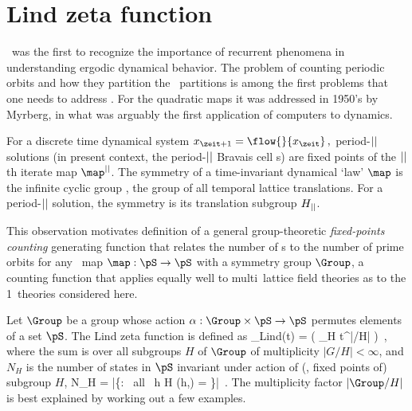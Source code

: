 

\section{Lind zeta function}
\label{sect:LC21Lind1d}

\Poincare\ was the first
to  recognize the importance of recurrent phenomena in understanding
ergodic dynamical behavior.
The problem of counting periodic orbits and how they partition
the \statesp\ partitions is among the
first problems that one needs to address%
.
For
the quadratic maps it was addressed in 1950's by
 {Myrberg}, in what was
arguably
the first application of computers to
dynamics.

For a discrete time dynamical system
\(
\ssp_{\zeit+1}=\flow{}{\ssp_{\zeit}}
\,,\)
period-${||}$ solutions (in present context, the period-${||}$ Bravais
cell {\lattstate}s) are fixed points of the ${||}$th iterate map
$\map^\cl{}$.
The symmetry of a time-invariant dynamical `law' $\map$ is 
the {infinite cyclic group} \Cn{\infty},
the group of all temporal lattice translations. For a period-${||}$
solution, the symmetry is its translation subgroup $H_{{||}}$.

This observation motivates definition of a general group-theoretic
\emph{fixed-points counting} generating  function that relates the number
of {\lattstate}s to the number of prime orbits for any \statesp\ map
\(
\map : \pS \to \pS
\)
with a symmetry group $\Group$, a counting function that applies equally
well to multi\dmn\ lattice field theories as to the 1\dmn\
theories considered here.

Let $\Group$ be a group whose action
$\alpha: \Group \times \pS \to \pS$ 
permutes elements of a set $\pS$.
The Lind zeta function is defined as
\beq
\zeta_{Lind}(t) =
\exp \left( \sum_{H} \;
            t^{|\Group/H|}
      \right)
\,,
where the sum is over all subgroups $H$ of $\Group$
of multiplicity $|G/H| < \infty$, and $N_{H}$ is the number of states
in $\pS$ invariant under action of (\ie, fixed points of) subgroup $H$,
\beq
N_{H} =
   |\{\Xx \in \pS : \mbox{ all } h \in H \quad \alpha(h,\Xx) = \Xx\}|
\,.
The multiplicity factor $|\Group/{H}|$ is best explained by working out a
few examples.

